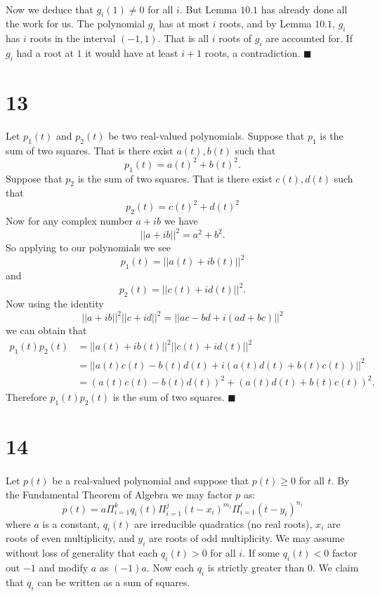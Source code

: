 \documentclass[letterpaper,12pt,oneside,onecolumn]{article}
\newcommand{\1}{\mathbbm{1}}
\begin{document}
\paragraph{}
Now we deduce that $g_i(1) \neq 0$ for all $i$. But Lemma $10.1$ has already done all the work for us. The polynomial $g_i$ has at most $i$ roots, and by Lemma $10.1$, $g_i$ has $i$ roots in the interval $(-1,1)$. That is all $i$ roots of $g_i$ are accounted for. If $g_i$ had a root at $1$ it would have at least $i+1$ roots, a contradiction. $\blacksquare$
\section*{13}
Let $p_1(t)$ and $p_2(t)$ be two real-valued polynomials. Suppose that $p_1$ is the sum of two squares. That is there exist $a(t), b(t)$ such that
$$p_1(t) = a(t)^2 + b(t)^2.$$
Suppose that $p_2$ is the sum of two squares. That is there exist $c(t), d(t)$ such that
$$p_2(t) = c(t)^2 + d(t)^2$$
Now for any complex number $a+ib$ we have
$$||a + ib||^2 = a^2 + b^2.$$
So applying to our polynomials we see
$$p_1(t) = ||a(t) + ib(t)||^2$$
and
$$p_2(t) = ||c(t) + id(t)||^2.$$
Now using the identity
$$||a + ib||^2||c+id||^2 = ||ac - bd + i(ad + bc)||^2$$
we can obtain that
\begin{align*}
p_1(t)p_2(t) &= ||a(t) + ib(t)||^2||c(t) + i d(t)||^2 \\
&= ||a(t)c(t) - b(t)d(t) + i(a(t)d(t) + b(t) c(t))||^2 \\
&= (a(t)c(t) - b(t)d(t))^2 + (a(t)d(t) + b(t)c(t))^2.
\end{align*}
Therefore $p_1(t)p_2(t)$ is the sum of two squares. $\blacksquare$
\section*{14}
\paragraph{}
Let $p(t)$ be a real-valued polynomial and suppose that $p(t) \geq 0$ for all $t$. By the Fundamental Theorem of Algebra we may factor $p$ as:
$$p(t) = a \Pi_{i=1}^k q_i(t) \Pi_{i=1}^j (t-x_i)^{m_i} \Pi_{i=1}^\ell (t-y_i)^{n_i}$$
where $a$ is a constant, $q_i(t)$ are irreducible quadratics (no real roots), $x_i$ are roots of even multiplicity, and $y_i$ are roots of odd multiplicity. We may assume without loss of generality that each $q_i(t) > 0$ for all $i$. If some $q_i(t) < 0$ factor out $-1$ and modify $a$ as $(-1)a$. Now each $q_i$ is strictly greater than $0$. We claim that $q_i$ can be written as a sum of squares.
\end{document}
